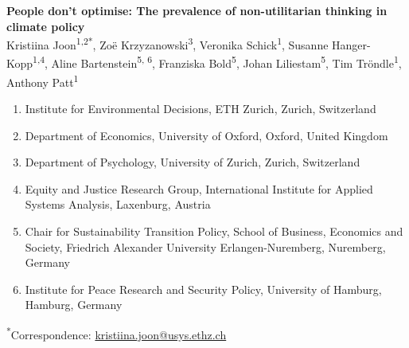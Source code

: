 \documentclass[10pt,letterpaper]{article}
\begin{document}
\singlespacing
\begin{center}
    \Large
    \textbf{People don't optimise: The prevalence of non-utilitarian thinking in climate policy}
    \\
    \vspace{4mm}
    \normalsize Kristiina Joon\textsuperscript{1,2*}, Zoë Krzyzanowski\textsuperscript{3}, Veronika Schick\textsuperscript{1}, Susanne Hanger-Kopp\textsuperscript{1,4}, Aline Bartenstein\textsuperscript{5, 6}, Franziska Bold\textsuperscript{5}, Johan Liliestam\textsuperscript{5}, Tim Tröndle\textsuperscript{1}, Anthony Patt\textsuperscript{1}
\end{center}


{
\footnotesize

\begin{enumerate}
    \item Institute for Environmental Decisions, ETH Zurich, Zurich, Switzerland
    \item Department of Economics, University of Oxford, Oxford, United Kingdom
    \item Department of Psychology, University of Zurich, Zurich, Switzerland
    \item Equity and Justice Research Group, International Institute for Applied Systems Analysis, Laxenburg, Austria
    \item Chair for Sustainability Transition Policy, School of Business, Economics and Society, Friedrich Alexander University Erlangen-Nuremberg, Nuremberg, Germany
    \item Institute for Peace Research and Security Policy, University of Hamburg, Hamburg, Germany
\end{enumerate}

\noindent \textsuperscript{*}Correspondence: \href{mailto:kristiina.joon@usys.ethz.ch}{kristiina.joon@usys.ethz.ch}
}
\end{document}
